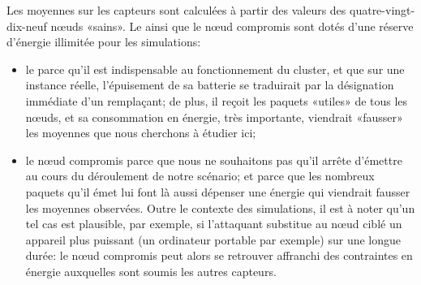 Les moyennes sur les capteurs sont calculées à partir des valeurs des quatre-vingt-dix-neuf nœuds «sains».
Le \ch ainsi que le nœud compromis sont dotés d'une réserve d'énergie illimitée pour les simulations:
\begin{itemize}
    \item le \ch parce qu'il est indispensable au fonctionnement du cluster, et que sur une instance réelle, l'épuisement de sa batterie se traduirait par la désignation immédiate d'un remplaçant; de plus, il reçoit les paquets «utiles» de tous les nœuds, et sa consommation en énergie, très importante, viendrait «fausser» les moyennes que nous cherchons à étudier ici;
    \item le nœud compromis parce que nous ne souhaitons pas qu'il arrête d'émettre au cours du déroulement de notre scénario; et parce que les nombreux paquets qu'il émet lui font là aussi dépenser une énergie qui viendrait fausser les moyennes observées. Outre le contexte des simulations, il est à noter qu'un tel cas est plausible, par exemple, si l'attaquant substitue au nœud ciblé un appareil plus puissant (un ordinateur portable par exemple) sur une longue durée: le nœud compromis peut alors se retrouver affranchi des contraintes en énergie auxquelles sont soumis les autres capteurs.
\end{itemize}




